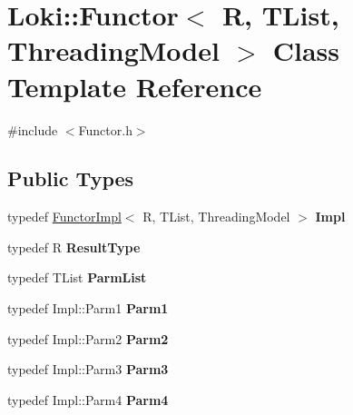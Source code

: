 \hypertarget{classLoki_1_1Functor}{}\section{Loki\+:\+:Functor$<$ R, T\+List, Threading\+Model $>$ Class Template Reference}
\label{classLoki_1_1Functor}


{\ttfamily \#include $<$Functor.\+h$>$}

\subsection*{Public Types}
\begin{DoxyCompactItemize}
\item 
\hypertarget{classLoki_1_1Functor_a469c91f010e9dbfe005c7f39bd629532}{}typedef \hyperlink{classLoki_1_1FunctorImpl}{Functor\+Impl}$<$ R, T\+List, Threading\+Model $>$ {\bfseries Impl}\label{classLoki_1_1Functor_a469c91f010e9dbfe005c7f39bd629532}

\item 
\hypertarget{classLoki_1_1Functor_aab1674f9e7992111585edcc08c054c3b}{}typedef R {\bfseries Result\+Type}\label{classLoki_1_1Functor_aab1674f9e7992111585edcc08c054c3b}

\item 
\hypertarget{classLoki_1_1Functor_a6cd8634373d48cddd07fab3af36a6279}{}typedef T\+List {\bfseries Parm\+List}\label{classLoki_1_1Functor_a6cd8634373d48cddd07fab3af36a6279}

\item 
\hypertarget{classLoki_1_1Functor_a045d5c968bdd63f343b544c0ea0d7a6f}{}typedef Impl\+::\+Parm1 {\bfseries Parm1}\label{classLoki_1_1Functor_a045d5c968bdd63f343b544c0ea0d7a6f}

\item 
\hypertarget{classLoki_1_1Functor_a640d485c38b777e0cfec8bb3bc338bf5}{}typedef Impl\+::\+Parm2 {\bfseries Parm2}\label{classLoki_1_1Functor_a640d485c38b777e0cfec8bb3bc338bf5}

\item 
\hypertarget{classLoki_1_1Functor_a4510c821c3b2e618bfb2f8cbe02595bd}{}typedef Impl\+::\+Parm3 {\bfseries Parm3}\label{classLoki_1_1Functor_a4510c821c3b2e618bfb2f8cbe02595bd}

\item 
\hypertarget{classLoki_1_1Functor_a8673526f4dacd4422c5ca244bc5741fb}{}typedef Impl\+::\+Parm4 {\bfseries Parm4}\label{classLoki_1_1Functor_a8673526f4dacd4422c5ca244bc5741fb}


\end{DoxyCompactItemize}
